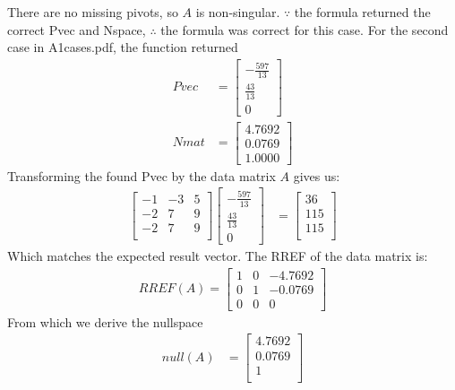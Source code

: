 \documentclass{article}
\begin{document}
		There are no missing pivots, so $A$ is non-singular. $\because$ the formula returned the correct Pvec and Nspace, $\therefore$ the formula was correct for this case.
	For the second case in A1cases.pdf, the function returned
		\begin{align*}
			Pvec &= \left[\begin{matrix}
				-\frac{597}{13}\\
				\frac{43}{13}\\
				0
			\end{matrix}\right]\\
			Nmat &= \left[\begin{matrix}
				4.7692\\
				0.0769\\
				1.0000
			\end{matrix}\right]
		\end{align*}
	Transforming the found Pvec by the data matrix $A$ gives us:
		\begin{align*}
			\left[\begin{matrix}
				-1 & -3 & 5\\
				-2 & 7 & 9\\
				-2 & 7 & 9\\
			\end{matrix}\right]\left[\begin{matrix}
				-\frac{597}{13}\\
				\frac{43}{13}\\
				0
			\end{matrix}\right] &= \left[\begin{matrix}
				36\\
				115\\
				115\\
			\end{matrix}\right]
		\end{align*}
	Which matches the expected result vector. The RREF of the data matrix is:
		\begin{align*}
			RREF(A) = \left[\begin{matrix}
				1 & 0 & -4.7692\\
				0 & 1 & -0.0769\\
				0 & 0 & 0
			\end{matrix}\right]
		\end{align*}
	From which we derive the nullspace
		\begin{align*}
			null(A) &= \left[\begin{matrix}
				4.7692\\
				0.0769\\
				1\\
			\end{matrix}\right]
		\end{align*}
\end{document}
